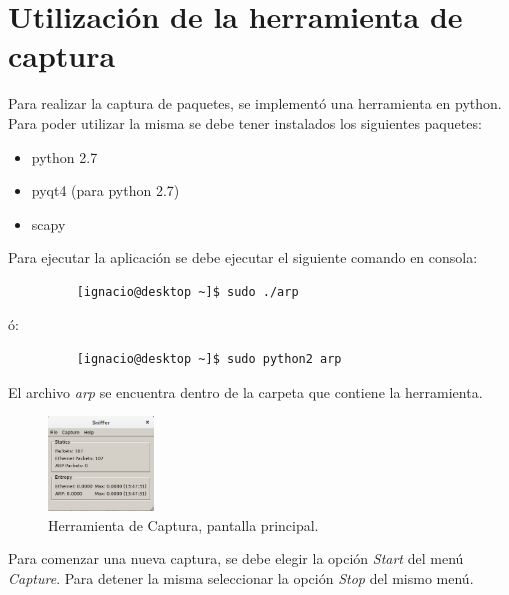 
\section{Utilización de la herramienta de captura}

Para realizar la captura de paquetes, se implementó una herramienta en python. Para poder utilizar la misma se debe tener instalados los siguientes paquetes:

\begin{itemize}
	\item python 2.7
	\item pyqt4 (para python 2.7)
	\item scapy
\end{itemize}

Para ejecutar la aplicación se debe ejecutar el siguiente comando en consola:

\begin{figure}[h!]
	\centering
	\begin{lstlisting}
	[ignacio@desktop ~]$ sudo ./arp
	\end{lstlisting}
\end{figure}

ó:


\begin{figure}[h!]
	\centering
	\begin{lstlisting}
	[ignacio@desktop ~]$ sudo python2 arp
	\end{lstlisting}
\end{figure}

El archivo \emph{arp} se encuentra dentro de la carpeta que contiene la herramienta.

\begin{figure}[h!]
	\caption{Herramienta de Captura, pantalla principal.}
	\centering
	\includegraphics[width=0.25\textwidth]{graficos/tool/tool}
\end{figure}

Para comenzar una nueva captura, se debe elegir la opción \emph{Start} del menú \emph{Capture}. Para detener la misma seleccionar la opción \emph{Stop} del mismo menú.


